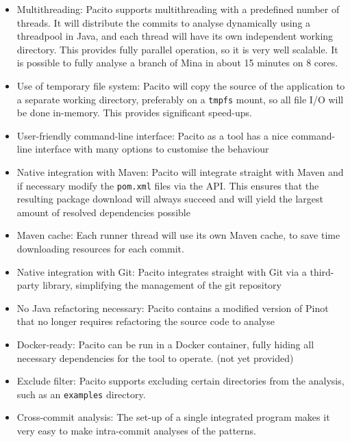 \begin{itemize}
    \item Multithreading: Pacito supports multithreading with a predefined number of threads. It will distribute the commits to analyse dynamically using a threadpool in Java, and each thread will have its own independent working directory. This provides fully parallel operation, so it is very well scalable. It is possible to fully analyse a branch of Mina in about 15 minutes on 8 cores.
    \item Use of temporary file system: Pacito will copy the source of the application to a separate working directory, preferably on a {\tt tmpfs} mount, so all file I/O will be done in-memory. This provides significant speed-ups.
    \item User-friendly command-line interface: Pacito as a tool has a nice command-line interface with many options to customise the behaviour
    \item Native integration with Maven: Pacito will integrate straight with Maven and if necessary modify the {\tt pom.xml} files via the API. This ensures that the resulting package download will always succeed and will yield the largest amount of resolved dependencies possible
    \item Maven cache: Each runner thread will use its own Maven cache, to save time downloading resources for each commit.
    \item Native integration with Git: Pacito integrates straight with Git via a third-party library, simplifying the management of the git repository
    \item No Java refactoring necessary: Pacito contains a modified version of Pinot that no longer requires refactoring the source code to analyse
    \item Docker-ready: Pacito can be run in a Docker container, fully hiding all necessary dependencies for the tool to operate. (not yet provided)
    \item Exclude filter: Pacito supports excluding certain directories from the analysis, such as an {\tt examples} directory.
    \item Cross-commit analysis: The set-up of a single integrated program makes it very easy to make intra-commit analyses of the patterns.
\end{itemize}

